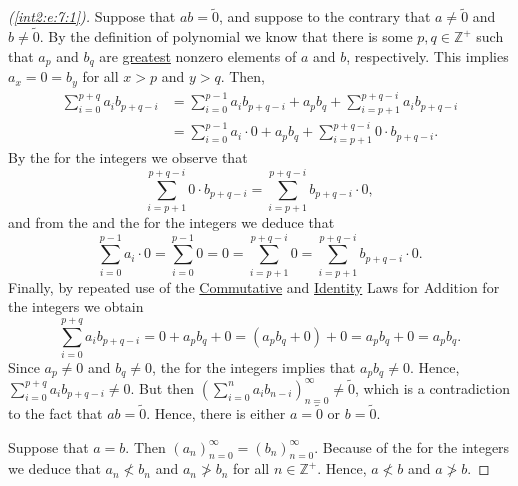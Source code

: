 \begin{proof}[(\ref{int2:e:7:1})]
	Suppose that $a b = \widetilde{0}$, and suppose to the contrary that $a \not= \widetilde{0}$ and $b \not= \widetilde{0}$. By the definition of polynomial we know that there is some $p, q \in \mathbb{Z}^{+}$ such that $a_p$ and $b_q$ are \hyperref[int2:e:7:d:greatest_element]{greatest} nonzero elements of $a$ and $b$, respectively. This implies $a_x = 0 = b_y$ for all $x > p$ and $y > q$. Then,
	\begin{align*}
		\sum_{i=0}^{p+q} a_i b_{p+q-i} & = \sum_{i=0}^{p-1} a_i b_{p+q-i} + a_p b_q + \sum_{i=p+1}^{p+q-i} a_i b_{p+q-i}    \\
		                               & = \sum_{i=0}^{p-1} a_i \cdot 0 + a_p b_q + \sum_{i=p+1}^{p+q-i} 0 \cdot b_{p+q-i}.
	\end{align*}
	By the  for the integers we observe that
	$$
		\sum_{i=p+1}^{p+q-i} 0 \cdot b_{p+q-i} = \sum_{i=p+1}^{p+q-i} b_{p+q-i} \cdot 0,
	$$
	and from the  and the  for the integers we deduce that
	$$
		\sum_{i=0}^{p-1} a_i \cdot 0 = \sum_{i=0}^{p-1} 0 = 0 = \sum_{i=p+1}^{p+q-i} 0 = \sum_{i=p+1}^{p+q-i} b_{p+q-i} \cdot 0.
	$$
	Finally, by repeated use of the \hyperref[int2:d:oid:commutative_add]{Commutative} and \hyperref[int2:d:oid:identity_add]{Identity} Laws for Addition for the integers we obtain
	$$
		\sum_{i=0}^{p+q} a_i b_{p+q-i} = 0 + a_p b_q + 0 = (a_p b_q + 0) + 0 = a_p b_q + 0 = a_p b_q.
	$$
	Since $a_p \not= 0$ and $b_q \not= 0$, the  for the integers implies that $a_p b_q \not= 0$. Hence, $\sum_{i=0}^{p+q} a_i b_{p+q-i} \not= 0$. But then $\left( \sum_{i=0}^n a_i b_{n-i} \right)_{n=0}^\infty \not= \widetilde{0}$, which is a contradiction to the fact that $a b = \widetilde{0}$. Hence, there is either $a = \widetilde{0}$ or $b = \widetilde{0}$.

	Suppose that $a = b$. Then $(a_n)_{n=0}^\infty = (b_n)_{n=0}^\infty$. Because of the  for the integers we deduce that $a_n \not< b_n$ and $a_n \not> b_n$ for all $n \in \mathbb{Z}^{+}$. Hence, $a \not< b$ and $a \not> b$.


\end{proof}
